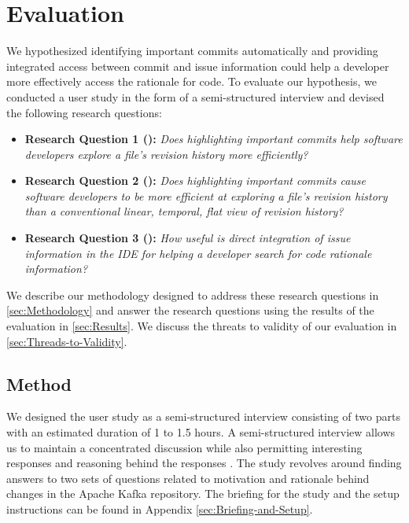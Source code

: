 \chapter{Evaluation}
\label{ch:Evaluation}

We hypothesized identifying important commits automatically and providing integrated access between commit and issue information could help a developer more effectively access the rationale for code.
To evaluate our hypothesis, we conducted a user study in the form of a semi-structured interview and devised the following research questions:

\begin{itemize}[leftmargin=*]
    \item[] \label{itm:RQ1} \textbf{Research Question 1 ():} \textit{Does highlighting important commits help software developers explore a file’s revision history more efficiently?}
    \item[] \label{itm:RQ2} \textbf{Research Question 2 ():} \textit{Does highlighting important commits cause software developers to be more efficient at exploring a file’s revision history than a conventional linear, temporal, flat view of revision history?}
    \item[] \label{itm:RQ3} \textbf{Research Question 3 ():} \textit{How useful is direct integration of issue information in the IDE for helping a developer search for code rationale information?}
  \end{itemize}

We describe our methodology designed to address these research questions in \autoref{sec:Methodology} and answer the research questions using the results of the evaluation in \autoref{sec:Results}.
We discuss the threats to validity of our evaluation in \autoref{sec:Threads-to-Validity}.

\section{Method}
\label{sec:Methodology}

We designed the user study as a semi-structured interview consisting of two parts with an estimated duration of 1 to 1.5 hours.
A semi-structured interview allows us to maintain a concentrated discussion while also permitting
interesting responses and reasoning behind the responses \cite{shull_guide_2007}.
The study revolves around finding answers to two sets of questions related to motivation and rationale behind changes in the Apache Kafka repository.
The briefing for the study and the setup instructions can be found in Appendix \ref{sec:Briefing-and-Setup}.

